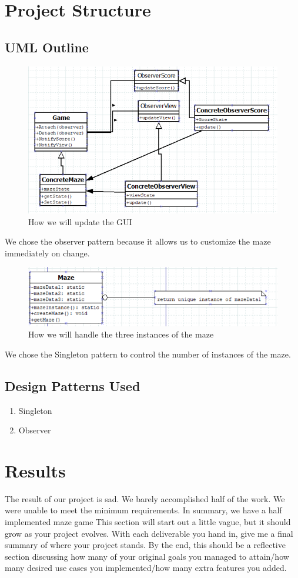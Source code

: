 \documentclass[10pt,conference,onecolumn,compsoc]{IEEEtran}
\begin{document}
\section{Project Structure}
\subsection{UML Outline}
\begin{figure}[ht!]
\includegraphics[scale=.5]{Observer.png}
\caption{How we will update the GUI}
\label{Game play}
\end{figure}
We chose the observer pattern because it allows us to customize the maze immediately on change.
\begin{figure}[ht!]
\includegraphics[scale=.5]{Singleton.png}
\caption{How we will handle the three instances of the maze}
\label{Maze instance}
\end{figure}
We chose the Singleton pattern to control the number of instances of the maze.
\clearpage
\subsection{Design Patterns Used}
\begin{enumerate}
\item Singleton
\item Observer
\end{enumerate}


\section{Results}
The result of our project is sad. We barely accomplished half of the work. We were unable to meet the minimum requirements. In summary, we have a half implemented maze game
This section will start out a little vague, but it should grow as your project evolves.  With each deliverable you hand in, give me a final summary of where your project stands.  By the end, this should be a reflective section discussing how many of your original goals you managed to attain/how many desired use cases you implemented/how many extra features you added.
\end{document}
